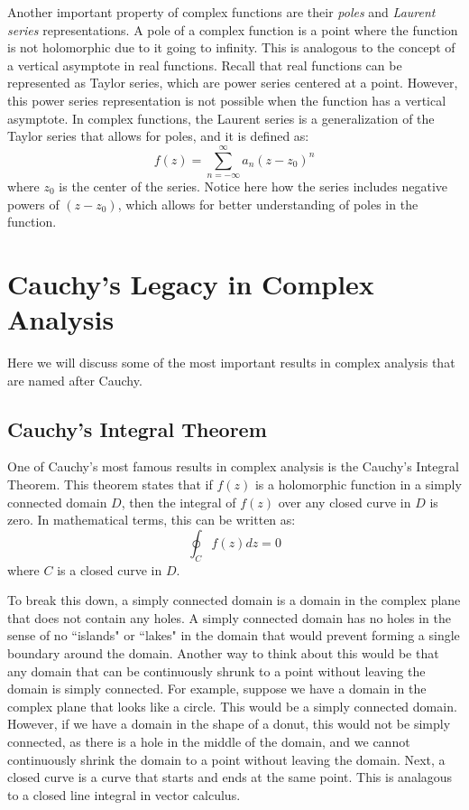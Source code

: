 \documentclass[12pt,letterpaper]{article}
\begin{document}
Another important property of complex functions are their \textit{poles} and \textit{Laurent series} representations.
A pole of a complex function is a point where the function is not holomorphic due to it going to infinity.
This is analogous to the concept of a vertical asymptote in real functions.
Recall that real functions can be represented as Taylor series, which are power series centered at a point.
However, this power series representation is not possible when the function has a vertical asymptote.
In complex functions, the Laurent series is a generalization of the Taylor series that allows for poles, and it is defined as:
$$ f(z) = \sum_{n = -\infty}^{\infty} a_n (z - z_0)^n $$
where $z_0$ is the center of the series.
Notice here how the series includes negative powers of $(z - z_0)$, which allows for better understanding of poles in the function. \cite{LangComplexAnalysis1998}

\section{Cauchy's Legacy in Complex Analysis}
Here we will discuss some of the most important results in complex analysis that are named after Cauchy.

\subsection{Cauchy's Integral Theorem}
One of Cauchy's most famous results in complex analysis is the Cauchy's Integral Theorem.
This theorem states that if $f(z)$ is a holomorphic function in a simply connected domain $D$, then the integral of $f(z)$ over any closed curve in $D$ is zero.
In mathematical terms, this can be written as:
$$ \oint_C f(z) dz = 0 $$
where $C$ is a closed curve in $D$.

To break this down, a simply connected domain is a domain in the complex plane that does not contain any holes.
A simply connected domain has no holes in the sense of no ``islands" or ``lakes" in the domain that would prevent forming a single boundary around the domain.
Another way to think about this would be that any domain that can be continuously shrunk to a point without leaving the domain is simply connected.
For example, suppose we have a domain in the complex plane that looks like a circle.
This would be a simply connected domain.
However, if we have a domain in the shape of a donut, this would not be simply connected, as there is a hole in the middle of the domain, and we cannot continuously shrink the domain to a point without leaving the domain.
Next, a closed curve is a curve that starts and ends at the same point.
This is analagous to a closed line integral in vector calculus.
\end{document}
